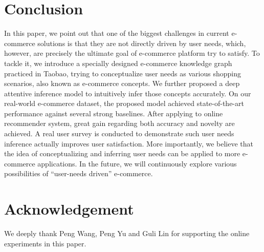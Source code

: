 \section{Conclusion}
\label{sec:conclusion}

In this paper,
we point out that one of the biggest challenges in current e-commerce solutions
is that they are not directly driven by user needs, 
which, however, are precisely the ultimate goal of e-commerce platform try to satisfy.
To tackle it, we introduce a specially designed e-commerce knowledge graph practiced in Taobao, trying to conceptualize user needs as various shopping scenarios, also known as e-commerce concepts. 
We further proposed a deep attentive inference model to intuitively infer those concepts accurately.
On our real-world e-commerce dataset, the proposed model achieved state-of-the-art performance against several strong baselines.
After applying to online recommender system, great gain regarding both accuracy and novelty are achieved. A real user survey is conducted to demonstrate such user needs inference actually improves user satisfaction.
More importantly, we believe that the idea of conceptualizing and inferring user needs can be applied to more e-commerce applications. In the future, we will continuously explore various possibilities of ``user-needs driven'' e-commerce.

\section{Acknowledgement}
\label{sec:ack}
We deeply thank Peng Wang, Peng Yu and Guli Lin for supporting the online experiments in this paper.